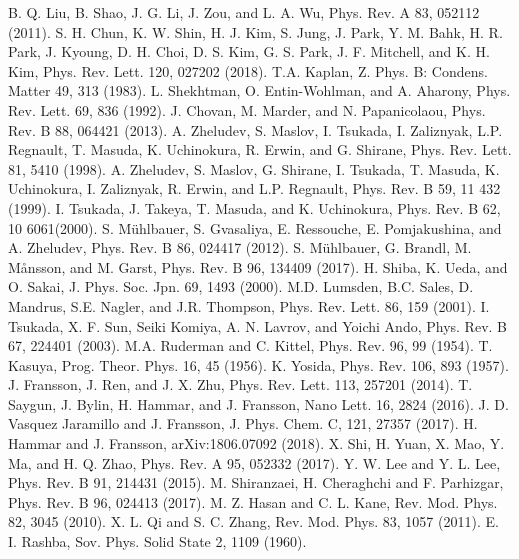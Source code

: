 \documentclass[aps,prb,twocolumn,showpacs,amssymb]{revtex4-1}
\begin{document}
\begin{thebibliography}{99}
 B. Q. Liu, B. Shao, J. G. Li, J. Zou, and L. A. Wu, Phys. Rev. A 83, 052112 (2011).
 S. H. Chun, K. W. Shin, H. J. Kim, S. Jung, J. Park, Y. M. Bahk, H. R. Park, J. Kyoung, D. H. Choi, D. S. Kim, G. S. Park, J. F. Mitchell, and K. H. Kim, Phys. Rev. Lett. 120, 027202 (2018).
 T.A. Kaplan, Z. Phys. B: Condens. Matter 49, 313 (1983).
 L. Shekhtman, O. Entin-Wohlman, and A. Aharony, Phys. Rev. Lett. 69, 836 (1992).
 J. Chovan, M. Marder, and N. Papanicolaou, Phys. Rev. B 88, 064421 (2013).
 A. Zheludev, S. Maslov, I. Tsukada, I. Zaliznyak, L.P. Regnault, T. Masuda, K. Uchinokura, R. Erwin, and G. Shirane, Phys. Rev. Lett. 81, 5410 (1998).
 A. Zheludev, S. Maslov, G. Shirane, I. Tsukada, T. Masuda, K. Uchinokura, I. Zaliznyak, R. Erwin, and L.P. Regnault, Phys. Rev. B 59, 11 432 (1999).
 I. Tsukada, J. Takeya, T. Masuda, and K. Uchinokura, Phys. Rev. B 62, 10 6061(2000).
 S. M\"{u}hlbauer, S. Gvasaliya, E. Ressouche, E. Pomjakushina, and A. Zheludev, Phys. Rev. B 86, 024417 (2012).
 S. M\"{u}hlbauer, G. Brandl, M. M{\aa}nsson, and M. Garst, Phys. Rev. B 96, 134409 (2017).
 H. Shiba, K. Ueda, and O. Sakai, J. Phys. Soc. Jpn. 69, 1493 (2000).
 M.D. Lumsden, B.C. Sales, D. Mandrus, S.E. Nagler, and J.R. Thompson, Phys. Rev. Lett. 86, 159 (2001).
 I. Tsukada, X. F. Sun, Seiki Komiya, A. N. Lavrov, and Yoichi Ando, Phys. Rev. B 67, 224401 (2003).
 M.A. Ruderman and C. Kittel, Phys. Rev. 96, 99 (1954).
 T. Kasuya, Prog. Theor. Phys. 16, 45 (1956).
 K. Yosida, Phys. Rev. 106, 893 (1957).
 J. Fransson, J. Ren, and J. X. Zhu, Phys. Rev. Lett. 113, 257201 (2014).
 T. Saygun, J. Bylin, H. Hammar, and J. Fransson, Nano Lett. 16, 2824 (2016).
 J. D. Vasquez Jaramillo and J. Fransson, J. Phys. Chem. C, 121, 27357 (2017).
 H. Hammar and J. Fransson, arXiv:1806.07092 (2018).
 X. Shi, H. Yuan, X. Mao, Y. Ma, and H. Q. Zhao, Phys. Rev. A 95, 052332 (2017).
 Y. W. Lee and Y. L. Lee, Phys. Rev. B 91, 214431 (2015).
 M. Shiranzaei, H. Cheraghchi and F. Parhizgar, Phys. Rev. B 96, 024413 (2017).
 M. Z. Hasan and C. L. Kane, Rev. Mod. Phys. 82, 3045 (2010).
 X. L. Qi and S. C. Zhang, Rev. Mod. Phys. 83, 1057 (2011).
 E. I. Rashba, Sov. Phys. Solid State 2, 1109 (1960).

\end{thebibliography}
\end{document}
